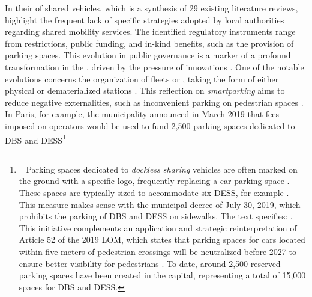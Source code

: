 \begin{refsegment}
In their  of shared vehicles, which is a synthesis of 29 existing literature reviews, \textcolor{blue}{\textcite[16]{mangeart_vehicules_2022}} highlight the frequent lack of specific strategies adopted by local authorities regarding shared mobility services. The identified regulatory instruments range from restrictions, public funding, and in-kind benefits, such as the provision of parking spaces. This evolution in public governance is a marker of a profound transformation in the , driven by the pressure of innovations \textcolor{blue}{\autocites[319]{canitez_pathways_2019}[4]{fryszman_smart_2019}}. One of the notable evolutions concerns the organization of  fleets or , taking the form of either physical or dematerialized stations \textcolor{blue}{\autocite[121]{6t-bureau_de_recherche_livre_2019}}. This reflection on \textsl{smartparking} aims to reduce negative externalities, such as inconvenient parking on pedestrian spaces \textcolor{blue}{\autocite[13]{zou_exploratory_2020}}. In Paris, for example, the municipality announced in March 2019 that fees imposed on operators would be used to fund 2,500 parking spaces dedicated to \acrshort{DBS} and \acrshort{DESS}\footnote{~
    Parking spaces dedicated to \textsl{dockless sharing} vehicles are often marked on the ground with a specific logo, frequently replacing a car parking space \textcolor{blue}{\autocite{livonniere_trottinettes_2019}}. These spaces are typically sized to accommodate six \acrshort{DESS}, for example \textcolor{blue}{\autocite{burban_trottinettes_2019}}. This measure makes sense with the municipal decree of July 30, 2019, which prohibits the parking of \acrshort{DBS} and \acrshort{DESS} on sidewalks. The text specifies:  \textcolor{blue}{\autocite[3151]{ville_de_paris_bulletin_2019}}. This initiative complements an application and strategic reinterpretation of Article 52 of the 2019 \acrfull{LOM}, which states that parking spaces for cars located within five meters of pedestrian crossings will be neutralized before 2027 to ensure better visibility for pedestrians \textcolor{blue}{\autocite[42]{gart_loi_2020}}. To date, around 2,500 reserved parking spaces have been created in the capital, representing a total of 15,000 spaces for \acrshort{DBS} and \acrshort{DESS}.
}
\end{refsegment}
